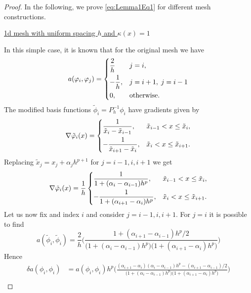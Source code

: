 \documentclass[10pt]{article}
\begin{document}
\begin{proof} In the following, we prove \eqref{eq:Lemma1Eq1} for different mesh constructions.
	
	\underline{1d mesh with uniform spacing $h$ and $\kappa(x) = 1$}
	
	In this simple case, it is known that for the original mesh we have
	\begin{equation}
			a(\phi_i, \phi_j) = \begin{dcases} \frac{2}{h} &j = i, \\
			-\frac{1}{h}, &j = i+1, \; j = i-1 \\				
			0, &\text{otherwise}.
			\end{dcases} 
	\end{equation}
	The modified basis functions $\tilde \phi_i = P_h^{-1} \phi_i$ have gradients given by
	\begin{equation}
		\nabla \tilde \phi_i(x) = \begin{dcases}
			\frac{1}{\tilde x_i - \tilde x_{i-1}}, &\tilde x_{i-1} < x \leq \tilde x_i,\\
			-\frac{1}{\tilde x_{i+1} - \tilde x_i}, &\tilde x_i < x \leq \tilde x_{i+1}.
		\end{dcases}
	\end{equation}
	Replacing $\tilde x_j = x_j + \alpha_j h^{p+1}$ for $j = i-1, i, i+1$ we get
	\begin{equation}
		\nabla \tilde \phi_i(x) = \frac{1}{h}\begin{dcases}
						\frac{1}{1 + (\alpha_i - \alpha_{i-1})h^p}, &\tilde x_{i-1} < x \leq \tilde x_i,\\
						-\frac{1}{1 + (\alpha_{i+1} - \alpha_i)h^p}, &\tilde x_i < x \leq \tilde x_{i+1}.
					    \end{dcases}
	\end{equation}
	Let us now fix and index $i$ and consider $j = i-1, i, i+1$. For $j = i$ it is possible to find
	\begin{equation}
		a(\tilde \phi_i, \tilde \phi_i) = \frac{2}{h}\Big(\frac{1 + (\alpha_{i+1} - \alpha_{i-1})h^p/2}{\big(1 + (\alpha_i - \alpha_{i-1})h^p\big)\big(1 + (\alpha_{i+1} - \alpha_i)h^p\big)}\Big)
	\end{equation}
	Hence
	\begin{equation}
	\begin{aligned}
		\delta a(\phi_i, \phi_i) &= a(\phi_i, \phi_i)h^p\Big(\frac{(\alpha_{i+1}-\alpha_i)(\alpha_i-\alpha_{i-1})h^p-(\alpha_{i+1} - \alpha_{i-1})/2}{\big(1 + (\alpha_i - \alpha_{i-1})h^p\big)\big(1 + (\alpha_{i+1} - \alpha_i)h^p\big)}\Big) \\

\end{aligned}
\end{equation}
\end{proof}
\end{document}
